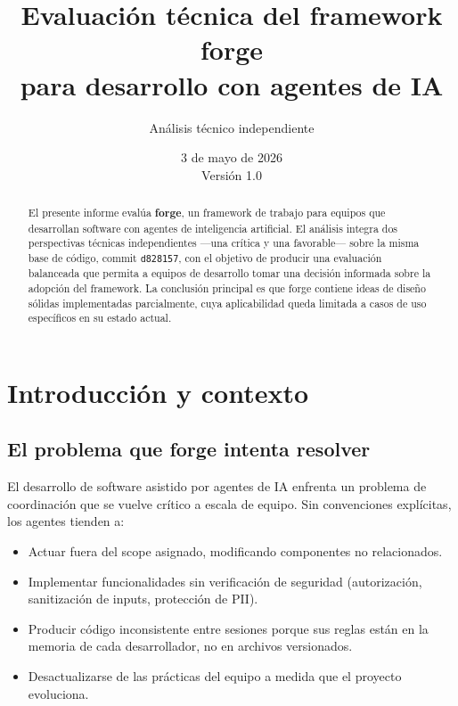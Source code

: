 \documentclass[12pt,a4paper]{article}
\title{\textbf{Evaluación técnica del framework forge}\\
\large para desarrollo con agentes de IA}
\author{Análisis técnico independiente}
\date{3 de mayo de 2026 \\ Versión 1.0}
\begin{document}
\maketitle
\thispagestyle{empty}

\begin{abstract}
El presente informe evalúa \textbf{forge}, un framework de trabajo para equipos que
desarrollan software con agentes de inteligencia artificial. El análisis integra dos
perspectivas técnicas independientes ---una crítica y una favorable--- sobre la misma
base de código, commit \texttt{d828157}, con el objetivo de producir una evaluación
balanceada que permita a equipos de desarrollo tomar una decisión informada sobre la
adopción del framework. La conclusión principal es que forge contiene ideas de diseño
sólidas implementadas parcialmente, cuya aplicabilidad queda limitada a casos de uso
específicos en su estado actual.
\end{abstract}

\tableofcontents
\newpage

\section{Introducción y contexto}

\subsection{El problema que forge intenta resolver}

El desarrollo de software asistido por agentes de IA enfrenta un problema de
coordinación que se vuelve crítico a escala de equipo. Sin convenciones explícitas,
los agentes tienden a:

\begin{itemize}
  \item Actuar fuera del scope asignado, modificando componentes no relacionados.
  \item Implementar funcionalidades sin verificación de seguridad (autorización,
        sanitización de inputs, protección de PII).
  \item Producir código inconsistente entre sesiones porque sus reglas están en la
        memoria de cada desarrollador, no en archivos versionados.
  \item Desactualizarse de las prácticas del equipo a medida que el proyecto evoluciona.
\end{itemize}
\end{document}
